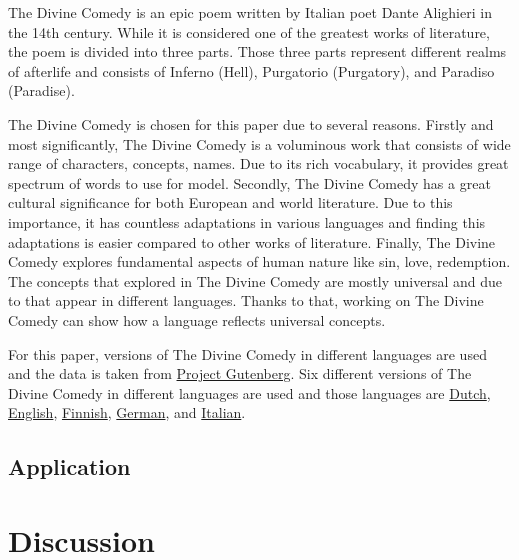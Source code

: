 \documentclass[man]{apa7}
\begin{document}
The Divine Comedy is an epic poem written by Italian poet Dante Alighieri in the 14th century. While it is considered one of the greatest works of literature, the poem is divided into three parts. Those three parts represent different realms of afterlife and consists of Inferno (Hell), Purgatorio (Purgatory), and Paradiso (Paradise).

The Divine Comedy is chosen for this paper due to several reasons. Firstly and most significantly, The Divine Comedy is a voluminous work that consists of wide range of characters, concepts, names. Due to its rich vocabulary, it provides great spectrum of words to use for model. Secondly, The Divine Comedy has a great cultural significance for both European and world literature. Due to this importance, it has countless adaptations in various languages and finding this adaptations is easier compared to other works of literature. Finally, The Divine Comedy explores fundamental aspects of human nature like sin, love, redemption. The concepts that explored in The Divine Comedy are mostly universal and due to that appear in different languages. Thanks to that, working on The Divine Comedy can show how a language reflects universal concepts.

For this paper, versions of The Divine Comedy in different languages are used and the data is taken from \href{https://www.gutenberg.org/}{Project Gutenberg}. Six different versions of The Divine Comedy in different languages are used and those languages are \href{https://www.gutenberg.org/cache/epub/39181/pg39181-images.html}{Dutch}, \href{https://www.gutenberg.org/cache/epub/1004/pg1004-images.html}{English}, \href{https://www.gutenberg.org/cache/epub/12546/pg12546.html}{Finnish}, \href{https://www.gutenberg.org/cache/epub/8085/pg8085.html}{German}, and \href{https://www.gutenberg.org/cache/epub/1000/pg1000-images.html}{Italian}.

\subsection{Application}



\section{Discussion}
\end{document}
